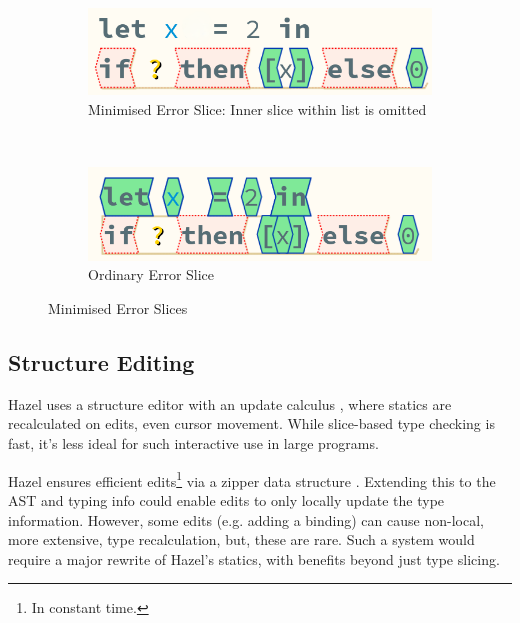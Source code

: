 \begin{figure}[h]
\centering
\begin{subfigure}{0.3\textwidth}
\centering

\includegraphics[width=1\textwidth]{Media/Figures/partially_inconsistent_compound}
\caption{Minimised Error Slice: Inner  slice within list is omitted}
\end{subfigure}$\qquad\qquad$
\begin{subfigure}{0.3\textwidth}
\centering

\includegraphics[width=1\textwidth]{Media/Figures/partially_inconsistent_compound_ordinary}
\caption{Ordinary Error Slice}
\end{subfigure}

\caption{Minimised Error Slices}
\label{fig:MinimisedSlice}
\end{figure}

\subsection{Structure Editing}\label{sec:StructureEditing}
Hazel uses a structure editor with an update calculus \cite{HazelStructureCalculus}, where statics are recalculated on edits, even cursor movement. While slice-based type checking is fast, it's less ideal for such interactive use in large programs.

Hazel ensures efficient edits\footnote{In constant time.} via a zipper data structure \cite{Zipper, OneHoleContext}. Extending this to the AST and typing info could enable edits to only locally update the type  information. However, some edits (e.g. adding a binding) can cause non-local, more extensive, type recalculation, but, these are rare. Such a system would require a major rewrite of Hazel's statics, with benefits beyond just type slicing.
  
